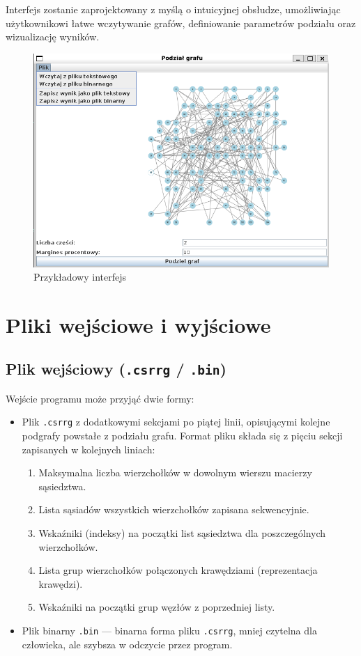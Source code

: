 \documentclass{article}
\begin{document}
    Interfejs zostanie zaprojektowany z myślą o intuicyjnej obsłudze, umożliwiając użytkownikowi łatwe wczytywanie grafów, definiowanie parametrów podziału oraz wizualizację wyników.
    
    \begin{figure}[H]
        \centering
        \includegraphics[width=0.9\linewidth]{img/interfejs.png}
        \caption{Przykładowy interfejs}
        \label{fig:graph}
    \end{figure}



\section{Pliki wejściowe i wyjściowe}

    \subsection{Plik wejściowy (\texttt{.csrrg} / \texttt{.bin})}
    
    Wejście programu może przyjąć dwie formy:
    \begin{itemize}
        \item Plik \texttt{.csrrg} z dodatkowymi sekcjami po piątej linii, opisującymi kolejne podgrafy powstałe z podziału grafu.
        Format pliku składa się z pięciu sekcji zapisanych w kolejnych liniach:
        \begin{enumerate}
            \item Maksymalna liczba wierzchołków w dowolnym wierszu macierzy sąsiedztwa.
            \item Lista sąsiadów wszystkich wierzchołków zapisana sekwencyjnie.
            \item Wskaźniki (indeksy) na początki list sąsiedztwa dla poszczególnych wierzchołków.
            \item Lista grup wierzchołków połączonych krawędziami (reprezentacja krawędzi).
            \item Wskaźniki na początki grup węzłów z poprzedniej listy.
        \end{enumerate}
        \item Plik binarny \texttt{.bin} — binarna forma pliku \texttt{.csrrg}, mniej czytelna dla człowieka, ale szybsza w odczycie przez program.
    \end{itemize}
    
\end{document}
